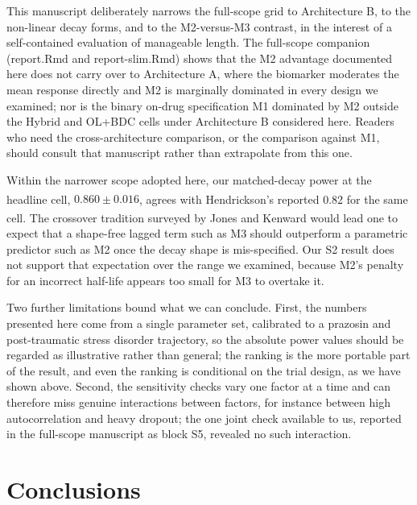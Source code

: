 \documentclass[
  11pt,
]{article}
\begin{document}
This manuscript deliberately narrows the full-scope grid to
Architecture B, to the non-linear decay forms, and to the
M2-versus-M3 contrast, in the interest of a self-contained
evaluation of manageable length. The full-scope companion
(report.Rmd and report-slim.Rmd)
shows that the M2 advantage documented here does not carry over to
Architecture A, where the biomarker moderates the mean response
directly and M2 is marginally dominated in every design we examined;
nor is the binary on-drug specification M1 dominated by M2 outside
the Hybrid and OL+BDC cells under Architecture B considered here.
Readers who need the cross-architecture comparison, or the
comparison against M1, should consult that manuscript rather than
extrapolate from this one.

Within the narrower scope adopted here, our matched-decay power at
the headline cell, \(0.860 \pm 0.016\), agrees with Hendrickson's\textsuperscript{} reported 0.82 for the same cell. The crossover
tradition surveyed by Jones and Kenward\textsuperscript{} would
lead one to expect that a shape-free lagged term such as M3 should
outperform a parametric predictor such as M2 once the decay shape is
mis-specified. Our S2 result does not support that expectation over
the range we examined, because M2's penalty for an incorrect
half-life appears too small for M3 to overtake it.

Two further limitations bound what we can conclude. First, the
numbers presented here come from a single parameter set, calibrated
to a prazosin and post-traumatic stress disorder trajectory, so the
absolute power values should be regarded as illustrative rather than
general; the ranking is the more portable part of the result, and
even the ranking is conditional on the trial design, as we have
shown above. Second, the sensitivity checks vary one factor at a
time and can therefore miss genuine interactions between factors,
for instance between high autocorrelation and heavy dropout; the one
joint check available to us, reported in the full-scope manuscript
as block S5, revealed no such interaction.

\section{Conclusions}\label{conclusions}
\end{document}
